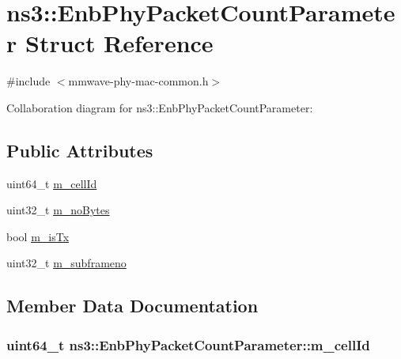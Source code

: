 \hypertarget{structns3_1_1EnbPhyPacketCountParameter}{}\section{ns3\+:\+:Enb\+Phy\+Packet\+Count\+Parameter Struct Reference}
\label{structns3_1_1EnbPhyPacketCountParameter}


{\ttfamily \#include $<$mmwave-\/phy-\/mac-\/common.\+h$>$}



Collaboration diagram for ns3\+:\+:Enb\+Phy\+Packet\+Count\+Parameter\+:
\subsection*{Public Attributes}
\begin{DoxyCompactItemize}
\item 
uint64\+\_\+t \hyperlink{structns3_1_1EnbPhyPacketCountParameter_a5011ee9bdeeefcdbfa0370838c569195}{m\+\_\+cell\+Id}
\item 
uint32\+\_\+t \hyperlink{structns3_1_1EnbPhyPacketCountParameter_a6788c6868b87f959d52f388e999d0d27}{m\+\_\+no\+Bytes}
\item 
bool \hyperlink{structns3_1_1EnbPhyPacketCountParameter_ae978daa50e1592a153d29221355ff974}{m\+\_\+is\+Tx}
\item 
uint32\+\_\+t \hyperlink{structns3_1_1EnbPhyPacketCountParameter_a325c11e2d4346bcda543bfcad6a4a99b}{m\+\_\+subframeno}
\end{DoxyCompactItemize}


\subsection{Member Data Documentation}
\subsubsection[{\texorpdfstring{m\+\_\+cell\+Id}{m_cellId}}]{\setlength{\rightskip}{0pt plus 5cm}uint64\+\_\+t ns3\+::\+Enb\+Phy\+Packet\+Count\+Parameter\+::m\+\_\+cell\+Id}\hypertarget{structns3_1_1EnbPhyPacketCountParameter_a5011ee9bdeeefcdbfa0370838c569195}{}\label{structns3_1_1EnbPhyPacketCountParameter_a5011ee9bdeeefcdbfa0370838c569195}
